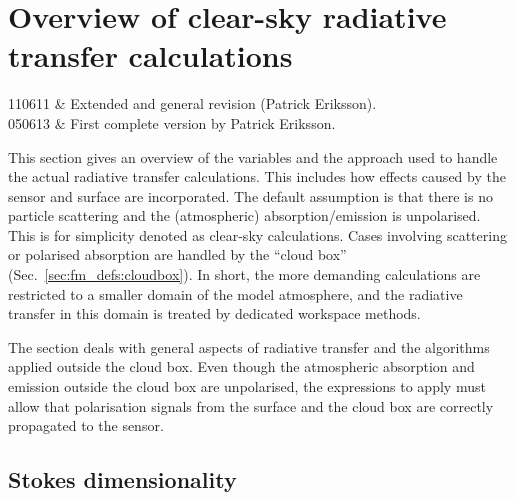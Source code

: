 \chapter{Overview of clear-sky radiative transfer 
calculations}
 \label{sec:rte}


 \starthistory
 110611 & Extended and general revision (Patrick Eriksson).\\
 050613 & First complete version by Patrick Eriksson.\\
 \stophistory

\graphicspath{{Figs/rte/}}

This section gives an overview of the variables and the approach used to handle
the actual radiative transfer calculations. This includes how
effects caused by the sensor and surface are incorporated. The default
assumption is that there is no particle scattering and the (atmospheric)
absorption/emission is unpolarised. This is for simplicity denoted as clear-sky
calculations. Cases involving scattering or polarised absorption are handled by
the ``cloud box'' (Sec.~\ref{sec:fm_defs:cloudbox}). In short, the more
demanding calculations are restricted to a smaller domain of the model
atmosphere, and the radiative transfer in this domain is treated by dedicated
workspace methods.

The section deals with general aspects of radiative transfer and the
algorithms applied outside the cloud box. Even though the atmospheric absorption
and emission outside the cloud box are unpolarised, the expressions to apply
must allow that polarisation signals from the surface and the cloud box are
correctly propagated to the sensor.




\section{Stokes dimensionality}
\label{sec:fm_defs:polarisation}

